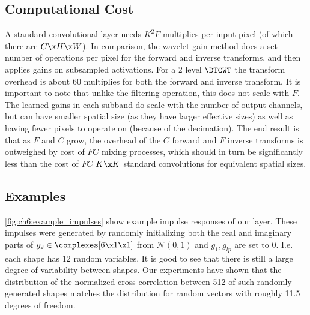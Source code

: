 \subsection{Computational Cost}
A standard convolutional layer needs $K^2 F$ multiplies per input pixel (of
which there are $C\x H\x W$). In comparison, the wavelet gain method does a set
number of operations per pixel for the forward and inverse transforms, and then
applies gains on subsampled activations. For a 2 level $\DTCWT$ the transform
overhead is about 60 multiplies for both the forward and inverse transform. It
is important to note that unlike the filtering operation, this does not scale
with $F$. The learned gains in each subband do scale with the number of output
channels, but can have smaller spatial size (as they have larger effective
sizes) as well as having fewer pixels to operate on (because of the decimation).
The end result is that as $F$ and $C$ grow, the overhead of the $C$ forward and
$F$ inverse transforms is outweighed by cost of $FC$ mixing processes, which
should in turn be significantly less than the cost of $FC$ $K\x K$ standard
convolutions for equivalent spatial sizes.



\subsection{Examples}
\autoref{fig:ch6:example_impulses} show example impulse responses of our layer.
These impulses were generated by randomly initializing both the real and
imaginary parts of $g_2 \in \complexes[6\x 1\x 1]$ from $\mathcal{N}(0,1)$ and
$g_1, g_{lp}$ are set to 0. I.e. each shape has 12 random variables. It is good
to see that there is still a large degree of variability between shapes. Our
experiments have shown that the distribution of the normalized cross-correlation
between 512 of such randomly generated shapes matches the distribution for
random vectors with roughly 11.5 degrees of freedom.

